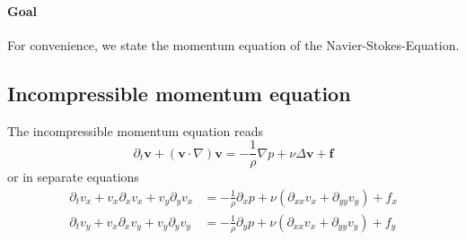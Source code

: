 
\paragraph{Goal}
\label{par:Goal}
For convenience, we state the momentum equation of the Navier-Stokes-Equation.

\subsection{Incompressible momentum equation}
\label{sub:Incompressible momentum equation}
The incompressible momentum equation reads
\begin{equation}
  \partial_t \mathbf{v} + \left(\mathbf{v}\cdot\nabla\right)\mathbf{v} = - \frac{1}{\rho}\nabla p + \nu \Delta \mathbf{v} + \mathbf{f}
\end{equation}
or in separate equations
\begin{equation}
  \begin{aligned}
    \partial_t v_x + v_x \partial_x v_x + v_y \partial_y v_x
    &= -  \frac{1}{\rho}\partial_x p + \nu (\partial_{xx} v_x + \partial_{yy} v_y) + f_x \\
    \partial_t v_y + v_x \partial_x v_y + v_y \partial_y v_y
    &= -  \frac{1}{\rho}\partial_y p + \nu (\partial_{xx} v_x + \partial_{yy} v_y) + f_y
  \end{aligned}
\end{equation}

